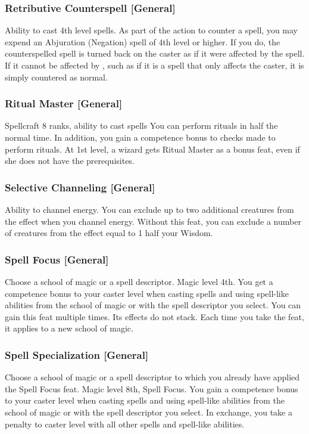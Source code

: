 \subsubsection{Retributive Counterspell [General]}
 Ability to cast 4th level spells.
 As part of the action to counter a spell, you may expend an Abjuration (Negation) spell of 4th level or higher. If you do, the counterspelled spell is turned back on the caster as if it were affected by the  spell. If it cannot be affected by , such as if it is a spell that only affects the caster, it is simply countered as normal.

\subsubsection{Ritual Master [General]}
 Spellcraft 8 ranks, ability to cast spells
 You can perform rituals in half the normal time. In addition, you gain a  competence bonus to checks made to perform rituals.
 At 1st level, a wizard gets Ritual Master as a bonus feat, even if she does not have the prerequisites.

\subsubsection{Selective Channeling [General]}
 Ability to channel energy.
 You can exclude up to two additional creatures from the effect when you channel energy.
 Without this feat, you can exclude a number of creatures from the effect equal to 1 \add half your Wisdom.

\subsubsection{Spell Focus [General]}
Choose a school of magic or a spell descriptor.
 Magic level 4th.
 You get a  competence bonus to your caster level when casting spells and using spell-like abilities from the school of magic or with the spell descriptor you select.
 You can gain this feat multiple times. Its effects do not stack. Each time you take the feat, it applies to a new school of magic.

\subsubsection{Spell Specialization [General]}
Choose a school of magic or a spell descriptor to which you already have applied the Spell Focus feat.
\featpre Magic level 8th, Spell Focus.
\featben You gain a  competence bonus to your caster level when casting spells and using spell-like abilities from the school of magic or with the spell descriptor you select. In exchange, you take a  penalty to caster level with all other spells and spell-like abilities.

